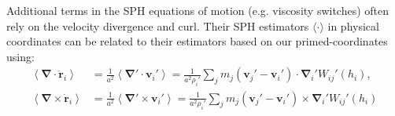 Additional terms in the SPH equations of motion (e.g. viscosity
switches) often rely on the velocity divergence and curl. Their SPH
estimators $\langle\cdot\rangle$ in physical coordinates can be
related to their estimators based on our primed-coordinates using:
\begin{align}
  \left\langle \mathbf{\nabla}\cdot\dot{\mathbf{r}}_i \right\rangle &=
  \frac{1}{a^2} \left\langle
  \mathbf{\nabla}'\cdot\mathbf{v}_i'\right\rangle =
  \frac{1}{a^2\rho_i'}\sum_j m_j\left(\mathbf{v}_j' -
  \mathbf{v}_i'\right) \cdot \mathbf{\nabla}_i'W_{ij}'(h_i), \nonumber \\
  \left\langle \mathbf{\nabla}\times\dot{\mathbf{r}}_i \right\rangle &=
  \frac{1}{a^2} \left\langle
  \mathbf{\nabla}'\times\mathbf{v}_i'\right\rangle =
  \frac{1}{a^2\rho_i'}\sum_j m_j\left(\mathbf{v}_j' -
  \mathbf{v}_i'\right) \times \mathbf{\nabla}_i'W_{ij}'(h_i) \nonumber
\end{align}

